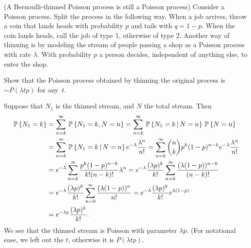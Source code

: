 \begin{question} (A Bernoulli-thinned Poisson process is still a
  Poisson process) Consider a Poisson process. Split the process in
  the following way. When a job arrives, throw a coin that lands heads
  with probability $p$ and tails with $q=1-p$. When the coin lands
  heads, call the job of type 1, otherwise of type 2.  Another way of
  thinning is by modeling the stream of people passing a shop as a
  Poisson process with rate $\lambda$. With probability $p$ a person
  decides, independent of anything else, to enter the shop.

  Show that the Poisson process obtained by thinning the original
  process is $\sim P(\lambda t p)$ for any~$t$.
 

    \begin{solution}
Suppose that  $N_1$ is the  thinned stream, and $N$ the total stream. Then
\begin{equation*}
  \begin{split}
    \,\mathbb{P}\left\{N_1 = k\right\}
&= \sum_{n=k}^\infty \,\mathbb{P}\left\{N_1 =k, N = n\right\} 
= \sum_{n=k}^\infty \,\mathbb{P}\left\{N_1 =k\,\middle|\, N = n\right\}\,\mathbb{P}\left\{N=n\right\} \\
&= \sum_{n=k}^\infty \,\mathbb{P}\left\{N_1 =k\,\middle|\, N = n\right\}e^{-\lambda} \frac{\lambda^n}{n!}
= \sum_{n=k}^\infty {n \choose k} p^k (1-p)^{n-k} e^{-\lambda} \frac{\lambda^n}{n!}\\
&= e^{-\lambda}\sum_{n=k}^\infty  \frac{p^k (1-p)^{n-k}}{k! (n-k)!} \lambda^n
= e^{-\lambda} \frac{(\lambda p)^k}{k!} \sum_{n=k}^\infty  \frac{(\lambda (1-p))^{n-k}}{(n-k)!}\\
&= e^{-\lambda} \frac{(\lambda p)^k}{k!} \sum_{n=0}^\infty  \frac{(\lambda (1-p))^{n}}{n!}
= e^{-\lambda} \frac{(\lambda p)^k}{k!} e^{\lambda(1-p)} \\
&= e^{-\lambda p} \frac{(\lambda p)^k}{k!}.
  \end{split}
\end{equation*}
We see that the thinned stream is Poisson with parameter $\lambda p$. (For notational ease, we left out the $t$, otherwise it is $P(\lambda t p)$. 


\end{solution}
\end{question}
